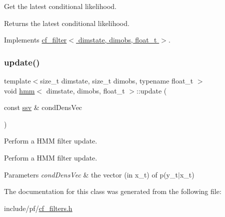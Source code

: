 Get the latest conditional likelihood. 

\begin{DoxyReturn}{Returns}
the latest conditional likelihood. 
\end{DoxyReturn}


Implements \hyperlink{classcf__filter_a11b26307172bf94b8075ed2cdb8fc09c}{cf\+\_\+filter$<$ dimstate, dimobs, float\+\_\+t $>$}.

\mbox{\label{classhmm_a5a25f1d14b38f0fae35a9072cfa0a368}} 
\subsubsection{\texorpdfstring{update()}{update()}}
{\footnotesize\ttfamily template$<$size\+\_\+t dimstate, size\+\_\+t dimobs, typename float\+\_\+t $>$ \\
void \hyperlink{classhmm}{hmm}$<$ dimstate, dimobs, float\+\_\+t $>$\+::update (\begin{DoxyParamCaption}\item[{const \hyperlink{classcf__filter_ad4bce534d6b7a494dae851846037c94b}{ssv} \&}]{cond\+Dens\+Vec }\end{DoxyParamCaption})}



Perform a H\+MM filter update. 

Perform a H\+MM filter update. 
\begin{DoxyParams}{Parameters}
{\em cond\+Dens\+Vec} & the vector (in x\+\_\+t) of p(y\+\_\+t$\vert$x\+\_\+t) \\
\hline
\end{DoxyParams}


The documentation for this class was generated from the following file\+:\begin{DoxyCompactItemize}
\item 
include/pf/\hyperlink{cf__filters_8h}{cf\+\_\+filters.\+h}\end{DoxyCompactItemize}
